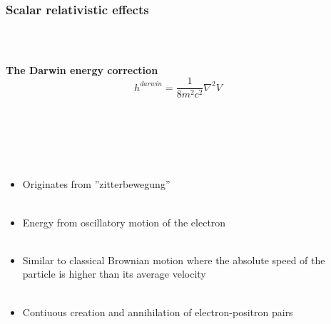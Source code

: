 \documentclass[mathserif,8pt]{beamer}
\begin{document}
\begin{frame}
    \frametitle{Scalar relativistic effects}
    \ \\
    \begin{columns}
    \begin{column}{.50\textwidth}
    \centering
    \textbf{The Darwin energy correction}
    \begin{equation}
	\nonumber
	h^{darwin} = \frac{1}{8m^2c^2} \nabla^2 V
    \end{equation}
    \ \\
    \ \\
    \ \\
    \ \\
    \ \\
    \begin{itemize}
	\item Originates from ''zitterbewegung''\\
	\ \\
	\item Energy from oscillatory motion of the electron\\
	\ \\
	\item Similar to classical Brownian motion where the absolute speed
	of the particle is higher than its average velocity\\
	\ \\
	\item Contiuous creation and annihilation of electron-positron pairs
    \end{itemize}
    \ \\
    \end{column}
    \begin{column}{.50\textwidth}
	\centering

\end{column}
\end{columns}
\end{frame}
\end{document}
